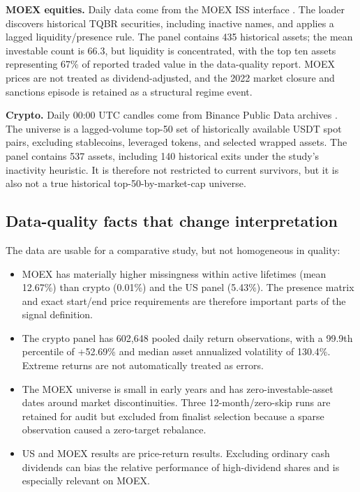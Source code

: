\documentclass[11pt,a4paper]{article}
\begin{document}
\textbf{MOEX equities.} Daily data come from the MOEX ISS interface \cite{moexiss}. The loader discovers historical TQBR securities, including inactive names, and applies a lagged liquidity/presence rule. The panel contains 435 historical assets; the mean investable count is 66.3, but liquidity is concentrated, with the top ten assets representing 67\% of reported traded value in the data-quality report. MOEX prices are not treated as dividend-adjusted, and the 2022 market closure and sanctions episode is retained as a structural regime event.

\textbf{Crypto.} Daily 00:00 UTC candles come from Binance Public Data archives \cite{binancepublic}. The universe is a lagged-volume top-50 set of historically available USDT spot pairs, excluding stablecoins, leveraged tokens, and selected wrapped assets. The panel contains 537 assets, including 140 historical exits under the study's inactivity heuristic. It is therefore not restricted to current survivors, but it is also not a true historical top-50-by-market-cap universe.

\subsection{Data-quality facts that change interpretation}

The data are usable for a comparative study, but not homogeneous in quality:

\begin{itemize}
  \item MOEX has materially higher missingness within active lifetimes (mean 12.67\%) than crypto (0.01\%) and the US panel (5.43\%). The presence matrix and exact start/end price requirements are therefore important parts of the signal definition.
  \item The crypto panel has 602,648 pooled daily return observations, with a 99.9th percentile of +52.69\% and median asset annualized volatility of 130.4\%. Extreme returns are not automatically treated as errors.
  \item The MOEX universe is small in early years and has zero-investable-asset dates around market discontinuities. Three 12-month/zero-skip runs are retained for audit but excluded from finalist selection because a sparse observation caused a zero-target rebalance.
  \item US and MOEX results are price-return results. Excluding ordinary cash dividends can bias the relative performance of high-dividend shares and is especially relevant on MOEX.
\end{itemize}
\end{document}
